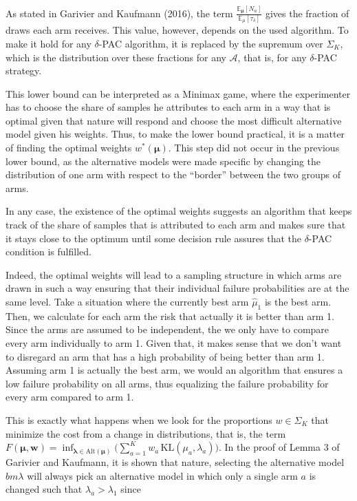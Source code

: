 \documentclass[12pt,]{article}
\newcommand{\KL}{\,\text{KL}}
\begin{document}
As stated in Garivier and Kaufmann (2016), the term
\(\frac{\mathbb{E}_{\bm{\mu}}[N_a]}{\mathbb{E}_{\mu}[\tau_{\delta}]}\)
gives the fraction of draws each arm receives. This value, however,
depends on the used algorithm. To make it hold for any \(\delta\)-PAC
algorithm, it is replaced by the supremum over \(\Sigma_K\), which is
the distribution over these fractions for any \(\mathcal{A}\), that is,
for any \(\delta\)-PAC strategy.

This lower bound can be interpreted as a Minimax game, where the
experimenter has to choose the share of samples he attributes to each
arm in a way that is optimal given that nature will respond and choose
the most difficult alternative model given his weights. Thus, to make
the lower bound practical, it is a matter of finding the optimal weights
\(w^*(\bm{\mu})\). This step did not occur in the previous lower bound,
as the alternative models were made specific by changing the
distribution of one arm with respect to the ``border'' between the two
groups of arms.

In any case, the existence of the optimal weights suggests an algorithm
that keeps track of the share of samples that is attributed to each arm
and makes sure that it stays close to the optimum until some decision
rule assures that the \(\delta\)-PAC condition is fulfilled.

Indeed, the optimal weights will lead to a sampling structure in which
arms are drawn in such a way ensuring that their individual failure
probabilities are at the same level. Take a situation where the
currently best arm \(\hat{\mu}_1\) is the best arm. Then, we calculate
for each arm the risk that actually it is better than arm 1. Since the
arms are assumed to be independent, the we only have to compare every
arm individually to arm 1. Given that, it makes sense that we don't want
to disregard an arm that has a high probability of being better than arm
1. Assuming arm 1 is actually the best arm, we would an algorithm that
ensures a low failure probability on all arms, thus equalizing the
failure probability for every arm compared to arm 1.

This is exactly what happens when we look for the proportions
\(w \in \Sigma_K\) that minimize the cost from a change in
distributions, that is, the term
\(F(\bm{\mu}, \bm{w}) = \inf_{\bm{\lambda} \in \text{Alt}(\bm{\mu})} \Big(\sum_{a= 1}^K w_a \KL(\mu_a, \lambda_a)\Big)\).
In the proof of Lemma 3 of Garivier and Kaufmann, it is shown that
nature, selecting the alternative model \(bm{\lambda}\) will always pick
an alternative model in which only a single arm \(a\) is changed such
that \(\lambda_a > \lambda_1\) since
\end{document}
